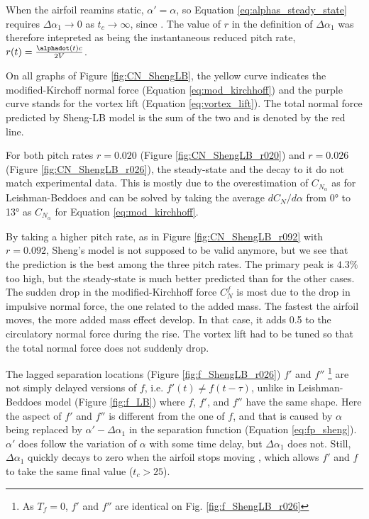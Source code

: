 When the airfoil reamins static, $\alpha'=\alpha$, so Equation \eqref{eq:alphas_steady_state} requires $\Delta \alpha_1 \rightarrow 0$ as $t_c \rightarrow \infty$, since  . The value of $r$ in the definition of $\Delta \alpha_1$ was therefore intepreted as being the instantaneous reduced pitch rate, $r(t)= \frac{\alphadot(t)c}{2V}$.

On all graphs of Figure \ref{fig:CN_ShengLB}, the yellow curve indicates the modified-Kirchoff normal force (Equation \eqref{eq:mod_kirchhoff}) and the purple curve stands for the vortex lift (Equation \eqref{eq:vortex_lift}). The total normal force predicted by Sheng-LB model is the sum of the two and is denoted by the red line. 

For both pitch rates $r=0.020$ (Figure \ref{fig:CN_ShengLB_r020}) and $r=0.026$ (Figure \ref{fig:CN_ShengLB_r026}), the steady-state and the decay to it do not match experimental data. This is mostly due to the overestimation of $C_{N_\alpha}$ as for Leishman-Beddoes and can be solved by taking the average $dC_N/d\alpha$ from \ang{0} to \ang{13} as $C_{N_\alpha}$ for Equation \eqref{eq:mod_kirchhoff}.

By taking a higher pitch rate, as in Figure \ref{fig:CN_ShengLB_r092} with $r=0.092$, Sheng's model is not supposed to be valid anymore, but we see that the prediction is the best among the three pitch rates. The primary peak is $4.3\%$ too high, but the steady-state is much better predicted than for the other cases. The sudden drop in the modified-Kirchhoff force $C_N^f$ is most due to the drop in impulsive normal force, the one related to the added mass. The fastest the airfoil moves, the more added mass effect develop. In that case, it adds 0.5 to the circulatory normal force during the rise. The vortex lift had to be tuned so that the total normal force does not suddenly drop. 

The lagged separation locations (Figure \ref{fig:f_ShengLB_r026}) $f'$ and $f''$ \footnote{As $T_f=0$, $f'$ and $f''$ are identical on Fig. \ref{fig:f_ShengLB_r026}} are not simply delayed versions of $f$, i.e. $f'(t)\neq f(t-\tau)$, unlike in Leishman-Beddoes model (Figure \ref{fig:f_LB}) where $f$, $f'$, and $f''$ have the same shape. Here the aspect of $f'$ and $f''$ is different from the one of $f$, and that is caused by $\alpha$ being replaced by $\alpha'- \Delta \alpha_1$ in the separation function (Equation \eqref{eq:fp_sheng}). $\alpha'$ does follow the variation of $\alpha$ with some time delay, but $\Delta \alpha_1$ does not. Still, $\Delta \alpha_1$ quickly decays to zero when the airfoil stops moving , which allows $f'$ and $f$ to take the same final value ($t_c > 25$).


